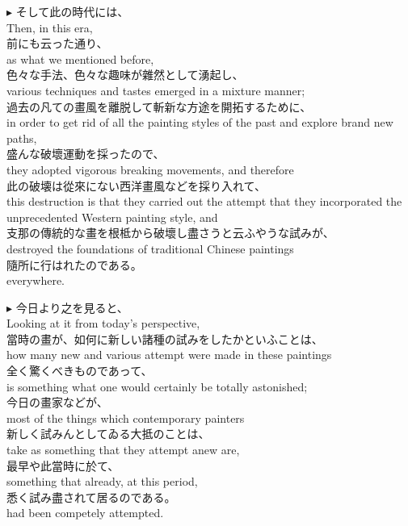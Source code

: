 \documentclass{ctexart}
\makeatletter
\newcommand*{\shifttext}[1]{%
  \settowidth{\@tempdima}{#1}%
  \hspace{-\@tempdima}#1%
}
\newcommand{\plabel}[1]{%
\shifttext{\textbf{#1}\quad}%
}
\makeatother
\begin{document}
\vspace{1em}
\plabel{$\blacktriangleright$}%
そして此の時代には、\\
Then, in this era,\\
前にも云った通り、\\
as what we mentioned before,\\
色々な手法、色々な趣味が雜然として湧起し、\\
various techniques and tastes emerged in a mixture manner;\\
過去の凡ての畫風を離脱して斬新な方途を開拓するために、\\
in order to get rid of all the painting styles of the past and explore brand new paths,\\
盛んな破壞運動を採ったので、\\
they adopted vigorous breaking movements, and therefore\\
此の破壊は從來にない西洋畫風などを採り入れて、\\
this destruction is that they carried out the attempt that they incorporated the unprecedented Western painting style, and\\
支那の傳統的な畫を根柢から破壞し盡さうと云ふやうな試みが、\\
destroyed the foundations of traditional Chinese paintings\\
隨所に行はれたのである。\\
everywhere.

\vspace{1em}
\plabel{$\blacktriangleright$}%
今日より之を見ると、\\
Looking at it from today's perspective,\\
當時の畫が、如何に新しい諸種の試みをしたかといふことは、\\
how many new and various attempt were made in these paintings\\
全く驚くべきものであって、\\
is something what one would certainly be totally astonished;\\
今日の畫家などが、\\
most of the things which contemporary painters\\
新しく試みんとしてゐる大抵のことは、\\
take as something that they attempt anew are,\\
最早や此當時に於て、\\
something that already, at this period,\\
悉く試み盡されて居るのである。\\
had been competely attempted.
\end{document}
